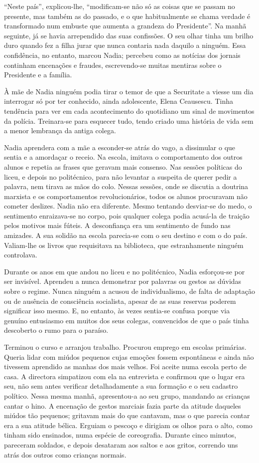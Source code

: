 ``Neste país'', explicou-lhe, ``modificam-se não só as coisas que se passam
no presente, mas também as do passado, e o que habitualmente se chama
verdade é transformado num embuste que aumenta a grandeza do
Presidente''. Na manhã seguinte, já se havia arrependido das suas
confissões. O seu olhar tinha um brilho duro quando fez a filha jurar
que nunca contaria nada daquilo a ninguém. Essa confidência, no entanto,
marcou Nadia; percebeu como as notícias dos jornais continham encenações
e fraudes, escrevendo-se muitas mentiras sobre o Presidente e a
família.

À mãe de Nadia ninguém podia tirar o temor de que a Securitate a viesse
um dia interrogar só por ter conhecido, ainda adolescente, Elena
Ceausescu. Tinha tendência para ver em cada acontecimento do quotidiano
um sinal de movimentos da polícia. Treinara-se para esquecer tudo, tendo
criado uma história de vida sem a menor lembrança da antiga colega.

Nadia aprendera com a mãe a esconder-se atrás do vago, a dissimular o
que sentia e a amordaçar o receio. Na
escola, imitava o comportamento dos outros alunos e repetia as frases
que geravam mais consenso. Nas sessões políticas do liceu, e depois no
politécnico, para não levantar a suspeita de querer pedir a palavra,
nem tirava as mãos do colo. Nessas sessões, onde se discutia a doutrina
marxista e os comportamentos revolucionários, todos os alunos procuravam
não cometer deslizes. Nadia não era diferente. Mesmo tentando desviar-se
do medo, o sentimento enraizava-se no corpo, pois qualquer colega
podia acusá-la de traição pelos motivos mais fúteis. A desconfiança
era um sentimento de fundo nas amizades. A sua solidão na escola
parecia-se com o seu destino e com o do país. Valiam-lhe os livros que
requisitava na biblioteca, que estranhamente ninguém controlava.

Durante os anos em que andou no liceu e no politécnico, Nadia esforçou-se por ser invisível. Aprendeu a nunca demonstrar
por palavras ou gestos as dúvidas sobre o regime. Nunca ninguém a acusou
de individualismo, de falta de adaptação ou de ausência de consciência
socialista, apesar de as suas reservas poderem significar isso mesmo. E,
no entanto, às vezes sentia-se confusa porque via genuíno entusiasmo em
muitos dos seus colegas, convencidos de que o país tinha descoberto o
rumo para o paraíso.

Terminou o curso e arranjou trabalho. Procurou emprego em escolas
primárias. Queria lidar com miúdos pequenos cujas emoções fossem
espontâneas e ainda não tivessem aprendido as manhas dos mais velhos.
Foi aceite numa escola perto de casa. A directora simpatizou com ela na
entrevista e confirmou que o lugar era seu, não sem antes verificar
detalhadamente a sua formação e o seu
cadastro político. Nessa mesma manhã, apresentou-a ao seu grupo,
mandando as crianças cantar o hino. A encenação de gestos marciais
fazia parte da atitude daqueles miúdos tão pequenos; gritavam mais do
que cantavam, mas o que parecia contar era a sua atitude bélica. Erguiam
o pescoço e dirigiam os olhos para o alto, como tinham sido ensinados,
numa espécie de coreografia. Durante cinco minutos, pareceram soldados,
e depois desataram aos saltos e aos gritos, correndo uns atrás dos
outros como crianças normais.

